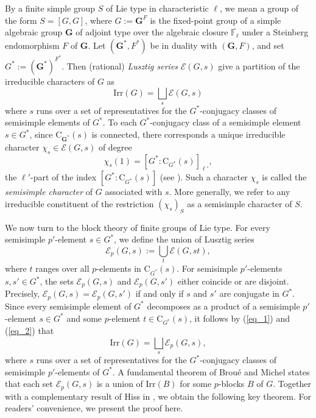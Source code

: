 \documentclass[10pt]{article}
\begin{document}
By a finite simple group $S$ of Lie type in characteristic $\ell$, we mean a group of the form $S = [G, G]$, where $G := \mathbf{G}^F$ is the fixed-point group of
a simple algebraic group $\mathbf{G}$ of adjoint type over the algebraic closure $\overline{\mathbb{F}_\ell}$
under a Steinberg endomorphism $F$ of $\mathbf{G}$.
Let $(\mathbf{G}^*, F^*)$ be in duality with $(\mathbf{G}, F)$, and set $G^* := (\mathbf{G}^*)^{F^*}$.
Then (rational) \emph{Lusztig series} $\mathcal{E}(G, s)$ give a partition of the irreducible characters of $G$ as 
\begin{equation}\label{eq_1}
   \mathrm{Irr}(G)=\bigsqcup_{s} \mathcal{E}(G, s)  
\end{equation}
where $s$ runs over a set of representatives for the $G^*$-conjugacy classes of semisimple elements of $G^*$.
To each $G^*$-conjugacy class of a semisimple element $s \in G^*$, 
since $\mathrm{C}_{\mathbf{G}^*}(s)$ is connected,
there corresponds a unique irreducible character $\chi_s \in \mathcal{E}(G, s)$ of degree
\[
\chi_s(1) = \left[G^* : \mathrm{C}_{G^*}(s)\right]_{\ell'},
\]
the $\ell'$-part of the index $\left[G^* : \mathrm{C}_{G^*}(s)\right]$ (see \cite[\S 14]{digne91}).
Such a character $\chi_s$ is called the \emph{semisimple character} of $G$ associated with $s$.
More generally, we refer to any irreducible constituent of the restriction $(\chi_s)_S$ as a semisimple character of $S$.





We now turn to the block theory of finite groups of Lie type.
For every semisimple $p'$-element $s \in G^*$, we define the union of Lusztig series
\begin{equation}\label{eq_2}
  \mathcal{E}_p(G, s) := \bigcup_{t} \mathcal{E}(G, st),
\end{equation}
where $t$ ranges over all $p$-elements in $\mathrm{C}_{G^*}(s)$.
For semisimple $p'$-elements $s, s' \in G^*$, the sets $\mathcal{E}_p(G, s)$ and $\mathcal{E}_p(G, s')$ either coincide or are disjoint. 
 Precisely, $\mathcal{E}_p(G, s) = \mathcal{E}_p(G, s')$ if and only if $s$ and $s'$ are conjugate in $G^*$.
Since every semisimple element of $G^*$ 
decomposes as a product of a semisimple $p'$-element $s\in G^*$ and some $p$-element $t\in \mathrm{C}_{G^*}(s)$,
it follows by (\ref{eq_1}) and (\ref{eq_2}) that
\[
\mathrm{Irr}(G)=\bigsqcup_{s} \mathcal{E}_p(G,s),
\]
  where $s$ runs over a set of representatives for the $G^*$-conjugacy classes of semisimple $p'$-elements of $G^*$.
 A fundamental theorem of Brou\'e and Michel \cite[Theorem 2.2]{broue89} states that each set $\mathcal{E}_p(G, s)$ is a union of $\mathrm{Irr}(B)$ for some $p$-blocks $B$ of $G$. 
Together with a complementary result of Hiss in \cite{hiss90}, we obtain the following key theorem.
For readers' convenience, we present the proof here.
\end{document}

